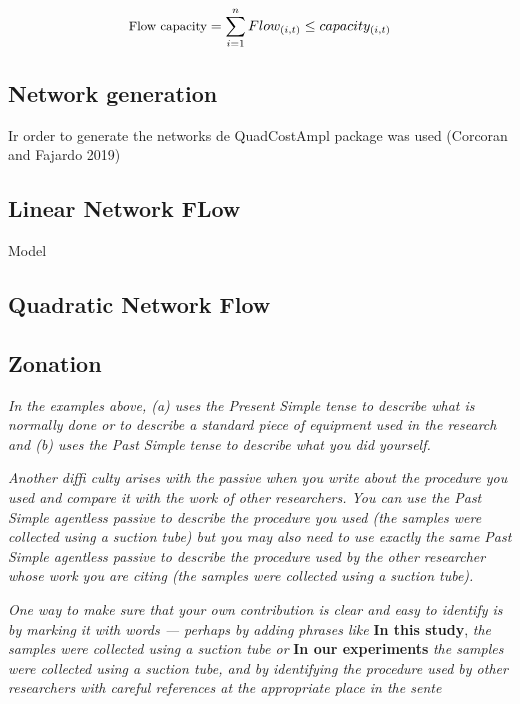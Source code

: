\documentclass[]{article}
\begin{document}
\[\small \text{Flow capacity} = \sum_{i=1}^n{Flow_{(i,t)}} \leq capacity_{(i,t)}\]

\hypertarget{network-generation}{%
\subsection{Network generation}\label{network-generation}}

Ir order to generate the networks de QuadCostAmpl package was used (Corcoran and Fajardo 2019)

\hypertarget{linear-network-flow}{%
\subsection{Linear Network FLow}\label{linear-network-flow}}

Model

\hypertarget{quadratic-network-flow}{%
\subsection{Quadratic Network Flow}\label{quadratic-network-flow}}

\hypertarget{zonation}{%
\subsection{Zonation}\label{zonation}}

\emph{In the examples above, (a) uses the Present Simple tense to
describe what is normally done or to describe a standard piece of equipment
used in the research and (b) uses the Past Simple tense to describe what
you did yourself.}

\emph{Another diffi culty arises with the passive when you write about the
procedure you used and compare it with the work of other researchers.
You can use the Past Simple agentless passive to describe the procedure
you used (the samples were collected using a suction tube) but you may
also need to use exactly the same Past Simple agentless passive to describe
the procedure used by the other researcher whose work you are citing (the
samples were collected using a suction tube).}

\emph{One way to make sure that your own contribution is clear and easy
to identify is by marking it with words --- perhaps by adding phrases
like} \textbf{In this study}, \emph{the samples were collected using a suction tube or} \textbf{In
our experiments} \emph{the samples were collected using a suction tube, and by
identifying the procedure used by other researchers with careful references
at the appropriate place in the sente}
\end{document}
